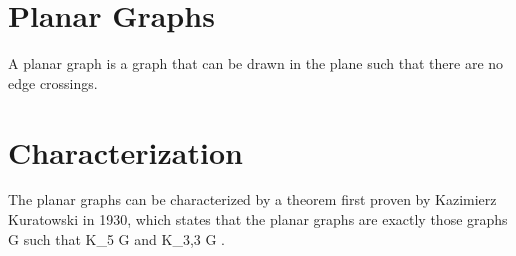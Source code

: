 \section{Planar Graphs}
A planar graph is a graph that can be drawn in the plane such that there are no edge crossings.

\section{Characterization}
The planar graphs can be characterized by a theorem first proven by Kazimierz Kuratowski in 1930, which states that the planar graphs are exactly those graphs G such that K_5 \not \preceq G  and K_{3,3} \not \preceq G .
